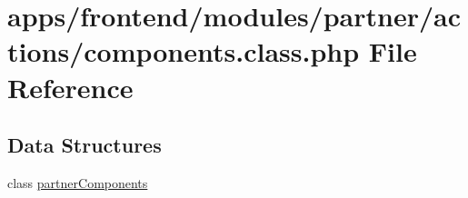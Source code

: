 \hypertarget{frontend_2modules_2partner_2actions_2components_8class_8php}{\section{apps/frontend/modules/partner/actions/components.class.\-php File Reference}
\label{frontend_2modules_2partner_2actions_2components_8class_8php}
}
\subsection*{Data Structures}
\begin{DoxyCompactItemize}
\item 
class \hyperlink{classpartner_components}{partner\-Components}
\end{DoxyCompactItemize}
